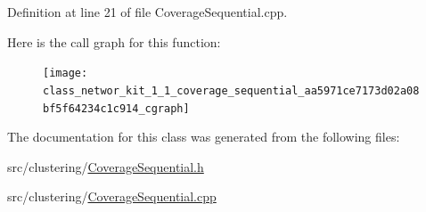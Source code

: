 Definition at line 21 of file Coverage\-Sequential.\-cpp.



Here is the call graph for this function\-:
\nopagebreak
\begin{figure}[H]
\begin{center}
\leavevmode
\texttt{[image: class\_networ\_kit\_1\_1\_coverage\_sequential\_aa5971ce7173d02a08bf5f64234c1c914\_cgraph]}
\end{center}
\end{figure}




The documentation for this class was generated from the following files\-:\begin{DoxyCompactItemize}
\item 
src/clustering/\hyperlink{_coverage_sequential_8h}{Coverage\-Sequential.\-h}\item 
src/clustering/\hyperlink{_coverage_sequential_8cpp}{Coverage\-Sequential.\-cpp}\end{DoxyCompactItemize}

